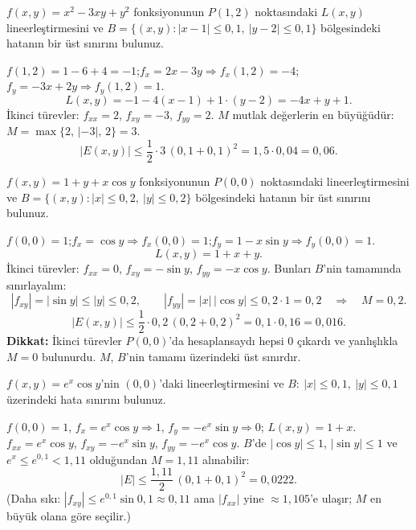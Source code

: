 \begin{soru}
$f(x,y)=x^2-3xy+y^2$ fonksiyonunun $P(1,2)$ noktasındaki $L(x,y)$ lineerleştirmesini ve
$B=\{(x,y):|x-1|\le0{,}1,\ |y-2|\le0{,}1\}$ bölgesindeki hatanın bir üst sınırını bulunuz.
\end{soru}
\begin{cevap}
$f(1,2)=1-6+4=-1$;\quad $f_x=2x-3y\Rightarrow f_x(1,2)=-4$;\quad $f_y=-3x+2y\Rightarrow f_y(1,2)=1$.
\[ L(x,y)=-1-4(x-1)+1\cdot(y-2)=-4x+y+1 . \]
İkinci türevler: $f_{xx}=2$, $f_{xy}=-3$, $f_{yy}=2$. $M$ mutlak değerlerin en büyüğüdür:
$M=\max\{2,\,|-3|,\,2\}=3$.
\[ |E(x,y)|\le\frac12\cdot3\,(0{,}1+0{,}1)^2=1{,}5\cdot0{,}04=0{,}06 . \]
\end{cevap}

\begin{soru}
$f(x,y)=1+y+x\cos y$ fonksiyonunun $P(0,0)$ noktasındaki lineerleştirmesini ve
$B=\{(x,y):|x|\le0{,}2,\ |y|\le0{,}2\}$ bölgesindeki hatanın bir üst sınırını bulunuz.
\end{soru}
\begin{cevap}
$f(0,0)=1$;\quad $f_x=\cos y\Rightarrow f_x(0,0)=1$;\quad $f_y=1-x\sin y\Rightarrow f_y(0,0)=1$.
\[ L(x,y)=1+x+y . \]
İkinci türevler: $f_{xx}=0$, $f_{xy}=-\sin y$, $f_{yy}=-x\cos y$. Bunları $B$'nin tamamında sınırlayalım:
\[
|f_{xy}|=|\sin y|\le|y|\le0{,}2,\qquad |f_{yy}|=|x|\,|\cos y|\le0{,}2\cdot1=0{,}2\quad\Rightarrow\quad M=0{,}2 .
\]
\[ |E(x,y)|\le\frac12\cdot0{,}2\,(0{,}2+0{,}2)^2=0{,}1\cdot0{,}16=0{,}016 . \]
\textbf{Dikkat:} İkinci türevler $P(0,0)$'da hesaplansaydı hepsi $0$ çıkardı ve yanlışlıkla $M=0$ bulunurdu. $M$,
$B$'nin tamamı üzerindeki üst sınırdır.
\end{cevap}

\begin{soru}
$f(x,y)=e^x\cos y$'nin $(0,0)$'daki lineerleştirmesini ve $B:\ |x|\le0{,}1,\ |y|\le0{,}1$ üzerindeki hata sınırını bulunuz.
\end{soru}
\begin{cevap}
$f(0,0)=1$, $f_x=e^x\cos y\Rightarrow1$, $f_y=-e^x\sin y\Rightarrow0$; $L(x,y)=1+x$.\\
$f_{xx}=e^x\cos y$, $f_{xy}=-e^x\sin y$, $f_{yy}=-e^x\cos y$. $B$'de $|\cos y|\le1$, $|\sin y|\le1$ ve $e^x\le e^{0{,}1}<1{,}11$
olduğundan $M=1{,}11$ alınabilir:
\[ |E|\le\frac{1{,}11}{2}\,(0{,}1+0{,}1)^2=0{,}0222 . \]
(Daha sıkı: $|f_{xy}|\le e^{0{,}1}\sin0{,}1\approx0{,}11$ ama $|f_{xx}|$ yine $\approx1{,}105$'e ulaşır; $M$ en büyük olana göre seçilir.)
\end{cevap}

